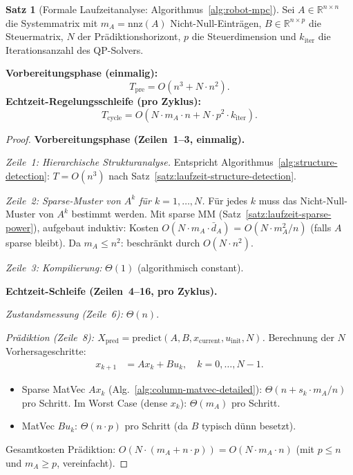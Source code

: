 \documentclass[a4paper,12pt]{report}
\theoremstyle{definition}
\newtheorem{satz}{Satz}
\begin{document}
	\begin{satz}[Formale Laufzeitanalyse: Algorithmus~\ref{alg:robot-mpc}]
		\label{satz:laufzeit-robot-mpc}
		Sei $A \in \mathbb{R}^{n \times n}$ die Systemmatrix mit $m_A = \mathrm{nnz}(A)$ Nicht-Null-Einträgen, $B \in \mathbb{R}^{n \times p}$ die Steuermatrix, $N$ der Prädiktionshorizont, $p$ die Steuerdimension und $k_{\mathrm{iter}}$ die Iterationsanzahl des QP-Solvers.

		\textbf{Vorbereitungsphase (einmalig):}
		\[
			T_{\mathrm{pre}} = O(n^3 + N \cdot n^2).
		\]
		\textbf{Echtzeit-Regelungsschleife (pro Zyklus):}
		\[
			T_{\mathrm{cycle}} = O(N \cdot m_A \cdot n + N \cdot p^2 \cdot k_{\mathrm{iter}}).
		\]
	\end{satz}
	\begin{proof}
		\textbf{Vorbereitungsphase (Zeilen~1--3, einmalig).}

		\textit{Zeile~1: Hierarchische Strukturanalyse.}
		Entspricht Algorithmus~\ref{alg:structure-detection}: $T = O(n^3)$ nach Satz~\ref{satz:laufzeit-structure-detection}.

		\textit{Zeile~2: Sparse-Muster von $A^k$ für $k=1,\ldots,N$.}
		Für jedes $k$ muss das Nicht-Null-Muster von $A^k$ bestimmt werden. Mit sparse MM (Satz~\ref{satz:laufzeit-sparse-power}), aufgebaut induktiv: Kosten $O(N \cdot m_A \cdot \bar{d}_A)$ = $O(N \cdot m_A^2/n)$ (falls $A$ sparse bleibt). Da $m_A \leq n^2$: beschränkt durch $O(N \cdot n^2)$.

		\textit{Zeile~3: Kompilierung:} $\Theta(1)$ (algorithmisch constant).

		\textbf{Echtzeit-Schleife (Zeilen~4--16, pro Zyklus).}

		\textit{Zustandsmessung (Zeile~6):} $\Theta(n)$.

		\textit{Prädiktion (Zeile~8): $X_{\mathrm{pred}} = \mathrm{predict}(A, B, x_{\mathrm{current}}, u_{\mathrm{init}}, N)$.}
		Berechnung der $N$ Vorhersageschritte:
		\begin{align*}
			x_{k+1} &= A x_k + B u_k, \quad k = 0, \ldots, N-1.
		\end{align*}
		\begin{itemize}
			\item Sparse MatVec $A x_k$ (Alg.~\ref{alg:column-matvec-detailed}): $\Theta(n + s_k \cdot m_A / n)$ pro Schritt. Im Worst Case (dense $x_k$): $\Theta(m_A)$ pro Schritt.
			\item MatVec $B u_k$: $\Theta(n \cdot p)$ pro Schritt (da $B$ typisch dünn besetzt).
		\end{itemize}
		Gesamtkosten Prädiktion: $O(N \cdot (m_A + n \cdot p)) = O(N \cdot m_A \cdot n)$ (mit $p \leq n$ und $m_A \geq p$, vereinfacht).


\end{proof}
\end{document}
